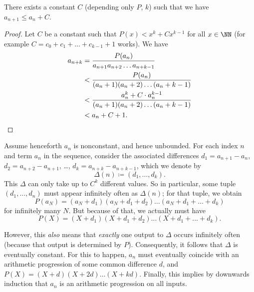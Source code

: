 \begin{claim*}
  There exists a constant $C$ (depending only $P$, $k$)
  such that we have $a_{n+1} \leq a_n + C$.
\end{claim*}
\begin{proof}
  Let $C$ be a constant such that $P(x) < x^k + Cx^{k-1}$ for all $x \in \NN$
  (for example $C = c_0 + c_1 + \dots + c_{k-1} + 1$ works).
  We have
  \begin{align*}
    a_{n+k} &= \frac{P(a_n)}{a_{n+1} a_{n+2} \dots a_{n+k-1}} \\
        &< \frac{P(a_n)}{(a_n+1)(a_n+2)\dots(a_n+k-1)} \\
        &< \frac{a_n^k + C \cdot a_n^{k-1}}{(a_n+1)(a_n+2)\dots(a_n+k-1)} \\
        &< a_n + C + 1. \qedhere
  \end{align*}
\end{proof}

Assume henceforth $a_n$ is nonconstant, and hence unbounded.
For each index $n$ and term $a_n$ in the sequence,
consider the associated differences
$d_1 = a_{n+1} - a_n$, $d_2 = a_{n+2} - a_{n+1}$, \dots, $d_k = a_{n+k}-a_{n+k-1}$,
which we denote by
\[ \Delta(n) \coloneqq (d_1, \dots, d_k).\]
This $\Delta$ can only take up to $C^k$ different values.
So in particular, some tuple $(d_1, \dots, d_n)$
must appear infinitely often as $\Delta(n)$; for that tuple, we obtain
\[ P(a_N) = (a_N+d_1)(a_N+d_1+d_2) \dots (a_N+d_1+\dots+d_k) \]
for infinitely many $N$.
But because of that, we actually must have
\[ P(X) = (X+d_1)(X+d_1+d_2) \dots (X+d_1+\dots+d_k). \]

However, this \emph{also} means that \emph{exactly} one output to $\Delta$
occurs infinitely often (because that output is determined by $P$).
Consequently, it follows that $\Delta$ is eventually constant.
For this to happen, $a_n$ must eventually coincide with an arithmetic
progression of some common difference $d$,
and $P(X) = (X+d)(X+2d) \dots (X+kd)$.
Finally, this implies by downwards induction that $a_n$ is
an arithmetic progression on all inputs.
